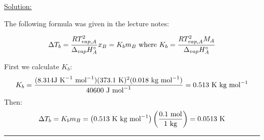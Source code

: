 \noindent
\underline{Solution:}

The following formula was given in the lecture notes:

$$\Delta T_b = \frac{RT^2_{vap,A}}{\Delta_{vap}H_A^\circ}x_B = K_bm_B\textnormal{ where }K_b = \frac{RT^2_{vap,A}M_A}{\Delta_{vap}H_A^\circ}$$

First we calculate $K_b$:
$$K_b = \frac{(8.314\textnormal{J K}^{-1}\textnormal{ mol}^{-1})(373.1\textnormal{ K})^2(0.018\textnormal{ kg mol}^{-1})}{40600\textnormal{ J mol}^{-1}} = 0.513\textnormal{ K kg mol}^{-1}$$
Then:
$$\Delta T_b = K_bm_B = \left(0.513\textnormal{ K kg mol}^{-1}\right)\left(\frac{0.1\textnormal{ mol}}{1\textnormal{ kg}}\right) = 0.0513\textnormal{ K}$$

\hrule\vspace{0.5cm}
